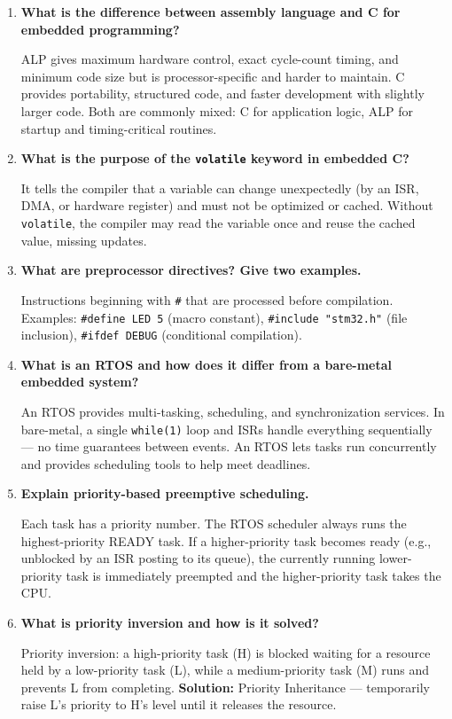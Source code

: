 \documentclass[12pt,a4paper]{article}
\newcommand{\Q}[1]{\textbf{#1}\par\noindent\ignorespaces}
\begin{document}
\begin{tcolorbox}[exambox, title={\textbf{Frequently Asked / Viva Questions}}]
\begin{enumerate}[topsep=0pt, label=\textbf{Q\arabic*.}, itemsep=5pt]
  \item \Q{What is the difference between assembly language and C for embedded programming?}
    ALP gives maximum hardware control, exact cycle-count timing, and minimum code size but is processor-specific and harder to maintain. C provides portability, structured code, and faster development with slightly larger code. Both are commonly mixed: C for application logic, ALP for startup and timing-critical routines.
  \item \Q{What is the purpose of the \texttt{volatile} keyword in embedded C?}
    It tells the compiler that a variable can change unexpectedly (by an ISR, DMA, or hardware register) and must not be optimized or cached. Without \texttt{volatile}, the compiler may read the variable once and reuse the cached value, missing updates.
  \item \Q{What are preprocessor directives? Give two examples.}
    Instructions beginning with \texttt{\#} that are processed before compilation. Examples: \texttt{\#define LED 5} (macro constant), \texttt{\#include "stm32.h"} (file inclusion), \texttt{\#ifdef DEBUG} (conditional compilation).
  \item \Q{What is an RTOS and how does it differ from a bare-metal embedded system?}
    An RTOS provides multi-tasking, scheduling, and synchronization services. In bare-metal, a single \texttt{while(1)} loop and ISRs handle everything sequentially --- no time guarantees between events. An RTOS lets tasks run concurrently and provides scheduling tools to help meet deadlines.
  \item \Q{Explain priority-based preemptive scheduling.}
    Each task has a priority number. The RTOS scheduler always runs the highest-priority READY task. If a higher-priority task becomes ready (e.g., unblocked by an ISR posting to its queue), the currently running lower-priority task is immediately preempted and the higher-priority task takes the CPU.
  \item \Q{What is priority inversion and how is it solved?}
    Priority inversion: a high-priority task (H) is blocked waiting for a resource held by a low-priority task (L), while a medium-priority task (M) runs and prevents L from completing. \textbf{Solution:} Priority Inheritance --- temporarily raise L's priority to H's level until it releases the resource.

\end{enumerate}
\end{tcolorbox}
\end{document}
